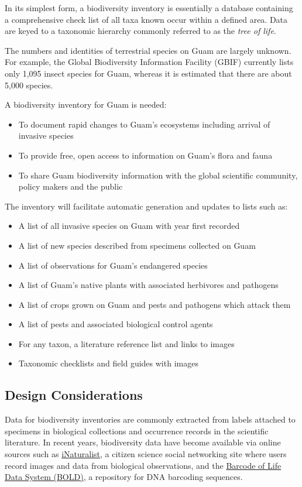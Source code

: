 \documentclass[12pt,letterpaper,english,bibliography=totocnumbered, abstract=on]{scrartcl}
\begin{document}
In its simplest form, a biodiversity inventory is essentially a database containing a comprehensive check list of all taxa known occur within a defined area. Data are keyed to a taxonomic hierarchy commonly referred to as the \textit{tree of life}. 

The numbers and identities of terrestrial species on Guam are largely unknown. For example, the Global Biodiversity Information Facility (GBIF) currently lists only 1,095 insect species for Guam, whereas it is estimated that there are about 5,000 species.

A biodiversity inventory for Guam is needed:

\begin{itemize}
	\item To document rapid changes to Guam’s ecosystems including arrival of invasive species
	\item To provide free, open access to information on Guam’s flora and fauna
	\item To share Guam biodiversity information with the global scientific community, policy makers and the public
\end{itemize}

The inventory will facilitate automatic generation and updates to lists such as:
\begin{itemize}
	\item A list of all invasive species on Guam with year first recorded
	\item A list of new species described from specimens collected on Guam
	\item A list of observations for Guam’s endangered species
	\item A list of Guam’s native plants with associated herbivores and pathogens
	\item A list of crops grown on Guam and pests and pathogens which attack them
	\item A list of pests and associated biological control agents
	\item For any taxon, a literature reference list and links to images
	\item Taxonomic checklists and field guides with images
\end{itemize}

\subsection{Design Considerations}

Data for biodiversity inventories are commonly extracted from labels attached to specimens in biological collections and occurrence records in the scientific literature. In recent years, biodiversity data have become available via online sources such as \href{https://inaturalist.org}{iNaturalist}, a citizen science social networking site where users record images and data from biological observations, and the \href{https://v3.boldsystems.org/}{Barcode of Life Data System (BOLD)}, a repository for DNA barcoding sequences.
\end{document}
